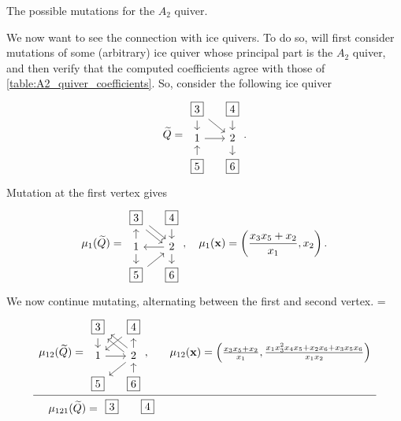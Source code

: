 \begin{example}
\begin{table}[ht!]
		\caption{The possible mutations for the $A_2$ quiver.}
		\label{table:A2_quiver_coefficients}
	\end{table}

	We now want to see the connection with ice quivers. To do so, will first consider
	mutations of some (arbitrary) ice quiver whose principal part is the $A_2$ quiver, and
	then verify that the computed coefficients agree with those of
	\cref{table:A2_quiver_coefficients}. So, consider the following ice quiver
	\begin{equation*}
		\tQ = \begin{tikzcd}[sep=small]
			\boxed{3} \dar \drar & \boxed{4} \dar \\
			1 \rar & 2 \dar \\
			\boxed{5} \uar & \boxed{6}
		\end{tikzcd}.
	\end{equation*}
	Mutation at the first vertex gives
	\begin{equation*}
		\mu_1(\tQ) = \begin{tikzcd}[sep=small]
			\boxed{3} \ar[dr, shift left] \ar[dr, shift right] & \boxed{4} \dar \\
			1 \uar \dar & 2 \lar \dar \\
			\boxed{5} \urar & \boxed{6}
		\end{tikzcd},\quad
		\mu_1(\bx) = \left(\frac{x_3x_5 + x_2}{x_1}, x_2\right).
	\end{equation*}
	We now continue mutating, alternating between the first and second vertex.
		{
			\everymath={\displaystyle}
			\begin{equation*}
				\begin{array}{rc}
					\mu_{12}(\tQ) = \begin{tikzcd}[sep=small, ampersand replacement=\&]
						                \boxed{3} \dar \ar[dr, shift left, leftarrow] \ar[dr, shift right, leftarrow] \& \boxed{4} \dlar \\
						                1  \rar \& 2 \uar \dlar  \\
						                \boxed{5} \& \boxed{6} \uar
					                \end{tikzcd},\quad &
					\mu_{12}(\bx) = \left(\frac{x_3x_5 + x_2}{x_1}, \frac{x_{1} x_{3}^{2} x_{4} x_{5} + x_{2} x_{6} + x_{3} x_{5} x_{6}}{x_{1} x_{2}}\right)                 \\
					\hline
					\mu_{121}(\tQ) = \begin{tikzcd}[sep=small, ampersand replacement=\&]
						                 \boxed{3}  \& \boxed{4}  \\

\end{tikzcd}
\end{array}
\end{equation*}}
\end{example}

